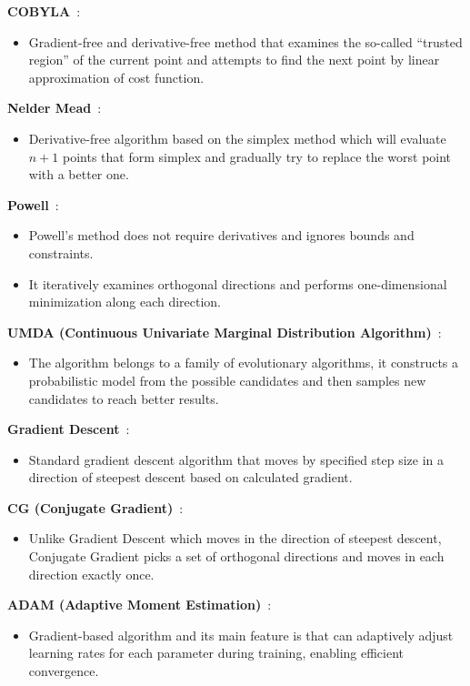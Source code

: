 \textbf{COBYLA}~\cite{cobyla}:
\begin{itemize}
    \item Gradient-free and derivative-free method that examines the so-called ``trusted region'' of the current point and attempts to find the next point by linear approximation of cost function.
\end{itemize}
\textbf{Nelder Mead}~\cite{nelder_mead}:
\begin{itemize}
    \item Derivative-free algorithm based on the simplex method which will evaluate $n+1$ points that form simplex and gradually try to replace the worst point with a better one.
\end{itemize}
\textbf{Powell}~\cite{powell}:
\begin{itemize}
    \item Powell's method does not require derivatives and ignores bounds and constraints.
    \item It iteratively examines orthogonal directions and performs one-dimensional minimization along each direction.
\end{itemize}
\textbf{UMDA (Continuous Univariate Marginal Distribution Algorithm)}~\cite{umda}:
\begin{itemize}
    \item The algorithm belongs to a family of evolutionary algorithms, it constructs a probabilistic model from the possible candidates and then samples new candidates to reach better results.
\end{itemize}
\textbf{Gradient Descent}~\cite{gd}:
\begin{itemize}
    \item Standard gradient descent algorithm that moves by specified step size in a direction of steepest descent based on calculated gradient.
\end{itemize}
\textbf{CG (Conjugate Gradient)}~\cite{cg}:
\begin{itemize}
    \item Unlike Gradient Descent which moves in the direction of steepest descent, Conjugate Gradient picks a set of orthogonal directions and moves in each direction exactly once.
\end{itemize}
\textbf{ADAM (Adaptive Moment Estimation)}~\cite{adam}:
\begin{itemize}
    \item Gradient-based algorithm and its main feature is that can adaptively adjust learning rates for each parameter during training, enabling efficient convergence.
\end{itemize}
